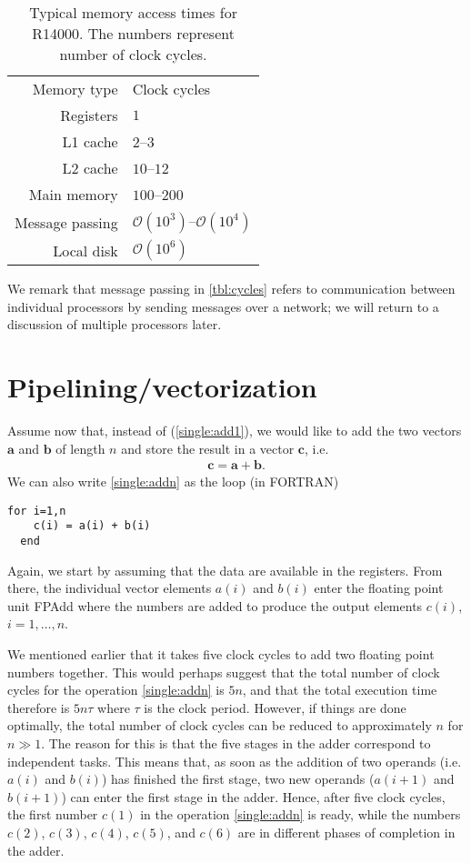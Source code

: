 \begin{table}
  \centering
  \caption{
    Typical memory access times for R14000. The numbers represent number of
    clock cycles.
  }
  \label{tbl:cycles}
  \bgroup{}
  \begin{tabular}{rl}
    \hline
    Memory type & Clock cycles \\ \hhline{==}
    Registers & $1$ \\ \hline
    L1 cache & $2$--$3$ \\ \hline
    L2 cache & $10$--$12$ \\ \hline
    Main memory &  $100$--$200$ \\ \hline
    Message passing & $\mathcal{O}(10^3)$--$\mathcal{O}(10^4)$ \\ \hline
    Local disk & $\mathcal{O}(10^6)$ \\ \hline
  \end{tabular}
  \egroup
\end{table}

We remark that message passing in \autoref{tbl:cycles} refers to communication
between individual processors by sending messages over a network; we will return
to a discussion of multiple processors later.

\section{Pipelining/vectorization}

Assume now that, instead of (\ref{single:add1}), we would like to add the two
vectors $\bm a$ and $\bm b$ of length $n$ and store the result in a vector $\bm
c$, i.e.
\begin{align}
  \bm c = \bm a + \bm b.
  \label{single:addn}
\end{align}
We can also write \eqref{single:addn} as the loop (in FORTRAN)
\begin{lstlisting}[style=fortran]
  for i=1,n
    c(i) = a(i) + b(i)
  end
\end{lstlisting}
Again, we start by assuming that the data are available in the registers. From
there, the individual vector elements $a(i)$ and $b(i)$ enter the floating point
unit FPAdd where the numbers are added to produce the output elements $c(i)$,
$i=1,\ldots,n$.

We mentioned earlier that it takes five clock cycles to add two floating point
numbers together. This would perhaps suggest that the total number of clock
cycles for the operation \eqref{single:addn} is $5n$, and that the total
execution time therefore is $5n\tau$ where $\tau$ is the clock period. However,
if things are done optimally, the total number of clock cycles can be reduced to
approximately $n$ for $n\gg 1$. The reason for this is that the five stages in
the adder correspond to independent tasks. This means that, as soon as the
addition of two operands (i.e. $a(i)$ and $b(i)$) has finished the first stage,
two new operands ($a(i+1)$ and $b(i+1)$) can enter the first stage in the adder.
Hence, after five clock cycles, the first number $c(1)$ in the operation
\eqref{single:addn} is ready, while the numbers $c(2)$, $c(3)$, $c(4)$, $c(5)$,
and $c(6)$ are in different phases of completion in the adder.


